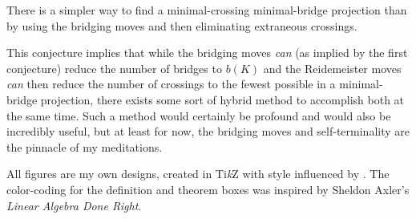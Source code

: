 \documentclass[titlepage]{article}
\begin{document}
\begin{conj}
    There is a simpler way to find a minimal-crossing minimal-bridge projection than by using the bridging moves and then eliminating extraneous crossings.
\end{conj}

This conjecture implies that while the bridging moves \emph{can} (as implied by the first conjecture) reduce the number of bridges to $b(K)$ and the Reidemeister moves \emph{can} then reduce the number of crossings to the fewest possible in a minimal-bridge projection, there exists some sort of hybrid method to accomplish both at the same time. Such a method would certainly be profound and would also be incredibly useful, but at least for now, the bridging moves and self-terminality are the pinnacle of my meditations.
\newpage






\noindent All figures are my own designs, created in Ti\emph{k}Z with style influenced by \cite{bib:knotbook}. The color-coding for the definition and theorem boxes was inspired by Sheldon Axler's \emph{Linear Algebra Done Right}.
\end{document}
